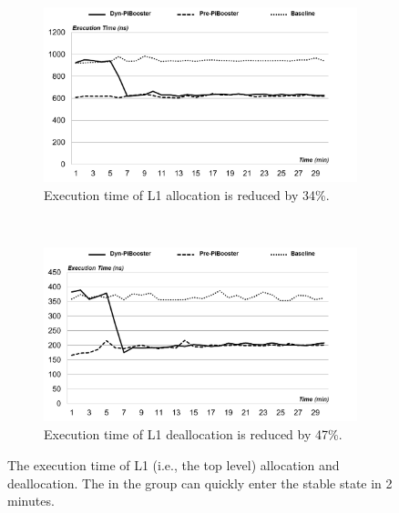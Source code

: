 \begin{figure}[t!]
    \centering
    \begin{subfigure}[t]{0.5\textwidth}
        \centering
        \includegraphics[height=2.0in]{image/micro/PGDalloc.png}
        \caption{Execution time of L1 allocation is reduced by 34\%.}
        \label{fig:l1a}
    \end{subfigure}%
    ~
    \begin{subfigure}[t]{0.5\textwidth}
        \centering
        \includegraphics[height=2.0in]{image/micro/PGDfree.png}
        \caption{Execution time of L1 deallocation is reduced by 47\%.}
        \label{fig:l1b}
    \end{subfigure}
    \caption{The execution time of L1 (i.e., the top level) allocation and deallocation. The \name in the \dynname group can quickly enter the stable state in 2 minutes.}
    \label{fig:PGDtime}
\end{figure}

